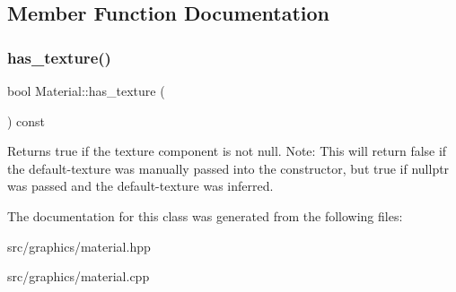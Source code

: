 \subsection{Member Function Documentation}
\mbox{\label{class_material_a2cbd77887660ea994ff3212d5630d575}} 
\subsubsection{\texorpdfstring{has\+\_\+texture()}{has\_texture()}}
{\footnotesize\ttfamily bool Material\+::has\+\_\+texture (\begin{DoxyParamCaption}{ }\end{DoxyParamCaption}) const}

Returns true if the texture component is not null. Note\+: This will return false if the default-\/texture was manually passed into the constructor, but true if nullptr was passed and the default-\/texture was inferred. 

The documentation for this class was generated from the following files\+:\begin{DoxyCompactItemize}
\item 
src/graphics/material.\+hpp\item 
src/graphics/material.\+cpp\end{DoxyCompactItemize}
